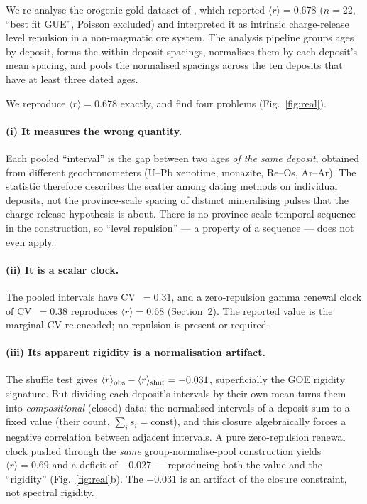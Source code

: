 \documentclass[11pt]{article}
\newcommand{\rr}{\langle r\rangle}
\begin{document}
We re-analyse the orogenic-gold dataset of \citet{chen2026metallogeny}, which
reported $\rr=0.678$ ($n=22$, ``best fit GUE'', Poisson excluded) and interpreted
it as intrinsic charge-release level repulsion in a non-magmatic ore system. The
analysis pipeline groups ages by deposit, forms the within-deposit spacings,
normalises them by each deposit's mean spacing, and pools the normalised spacings
across the ten deposits that have at least three dated ages.

We reproduce $\rr=0.678$ exactly, and find four problems
(Fig.~\ref{fig:real}).

\paragraph{(i) It measures the wrong quantity.} Each pooled ``interval'' is the
gap between two ages \emph{of the same deposit}, obtained from different
geochronometers (U--Pb xenotime, monazite, Re--Os, Ar--Ar). The statistic
therefore describes the scatter among dating methods on individual deposits, not
the province-scale spacing of distinct mineralising pulses that the charge-release
hypothesis is about. There is no province-scale temporal sequence in the
construction, so ``level repulsion'' --- a property of a sequence --- does not even
apply.

\paragraph{(ii) It is a scalar clock.} The pooled intervals have CV~$=0.31$, and a
zero-repulsion gamma renewal clock of CV~$=0.38$ reproduces $\rr=0.68$
(Section~2). The reported value is the marginal CV re-encoded; no repulsion is
present or required.

\paragraph{(iii) Its apparent rigidity is a normalisation artifact.} The shuffle
test gives $\rr_{\rm obs}-\rr_{\rm shuf}=-0.031$, superficially the GOE rigidity
signature. But dividing each deposit's intervals by their own mean turns them into
\emph{compositional} (closed) data: the normalised intervals of a deposit sum to a
fixed value (their count, $\sum_i s_i=\text{const}$), and this closure
algebraically forces a negative correlation between adjacent intervals. A pure
zero-repulsion renewal clock pushed through the \emph{same}
group-normalise-pool construction yields $\rr=0.69$ and a deficit of $-0.027$ ---
reproducing both the value and the ``rigidity'' (Fig.~\ref{fig:real}b). The
$-0.031$ is an artifact of the closure constraint, not spectral rigidity.
\end{document}
